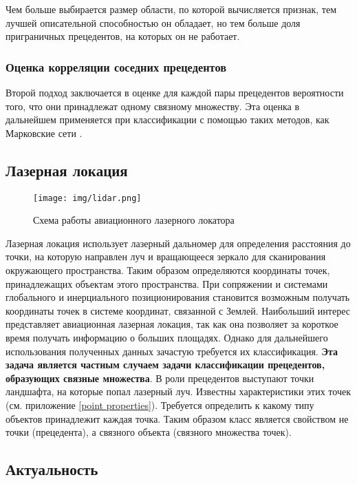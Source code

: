 Чем больше выбирается размер области, по которой вычисляется признак, тем лучшей описательной способностью он обладает, но тем больше доля приграничных прецедентов, на которых он не работает.
\subsubsection{Оценка корреляции соседних прецедентов}
Второй подход заключается в оценке для каждой пары прецедентов вероятности того, что они принадлежат одному связному множеству. Эта оценка в дальнейшем применяется при классификации с помощью таких методов, как Марковские сети \cite{Markov random fields, MMM}.

\subsection{Лазерная локация}
\begin{wrapfigure}{r}{9 cm}
	\texttt{[image: img/lidar.png]}
	\caption{Схема работы авиационного лазерного локатора}
\end{wrapfigure}
Лазерная локация использует лазерный дальномер для определения расстояния до точки, на которую направлен луч и вращающееся зеркало для сканирования окружающего пространства. Таким образом определяются координаты точек, принадлежащих объектам этого пространства. При сопряжении и системами глобального и инерциального позиционирования становится возможным получать координаты точек в системе координат, связанной с Землей. Наибольший интерес представляет авиационная лазерная локация, так как она позволяет за короткое время получать информацию о больших площадях.
Однако для дальнейшего использования полученных данных зачастую требуется их классификация. \textbf{Эта задача является частным случаем задачи классификации прецедентов, образующих связные множества}. В роли прецедентов выступают точки ландшафта, на которые попал лазерный луч. Известны характеристики этих точек (см. приложение \ref{point properties}). Требуется определить к какому типу объектов принадлежит каждая точка. Таким образом класс является свойством не точки (прецедента), а связного объекта (связного множества точек).

\subsection{Актуальность}

